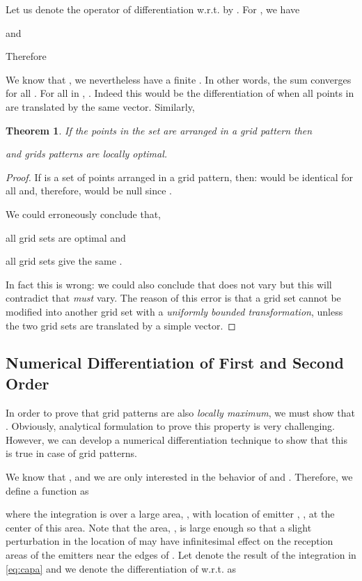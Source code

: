 \documentclass[12pt,english]{article}
\newtheorem{theorem}{Theorem}[section]
\begin{document}
Let us denote the operator of differentiation w.r.t.  by . For \mbox{}, we have 
 
and 
 
Therefore

We know that \mbox{}, we nevertheless have a finite . In other words, the sum  converges for all . For all  in , \mbox{}. Indeed this would be the differentiation of  when all points in  are translated by the same vector. Similarly, 
 

\begin{theorem}
If the points in the set  are arranged in a grid pattern then 
 
and grids patterns are {\em locally optimal}. 
\end{theorem}

\begin{proof}
If  is a set of points arranged in a grid pattern, then: \mbox{} would be identical for all  and, therefore, would be null since \mbox{}. 

We could erroneously conclude that,
\begin{compactitem}[-]
\item all grid sets are optimal and
\item all grid sets give the same .
\end{compactitem}
In fact this is wrong: we could also conclude that  does not vary but this will contradict that  {\em must} vary. The reason of this error is that a grid set cannot be modified into another grid set with a {\em uniformly bounded transformation}, unless the two grid sets are translated by a simple vector. 
\end{proof}

\subsection{Numerical Differentiation of First and Second Order}
\label{sec:grid_second_order}

In order to prove that grid patterns are also {\em locally maximum}, we must show that
.
Obviously, analytical formulation to prove this property is very challenging. However, we can develop a numerical differentiation technique to show that this is true in case of grid patterns. 

We know that \mbox{}, and we are only interested in the behavior of  and . Therefore, we define a function  as

where the integration is over a large area, , with location of emitter , , at the center of this area. Note that the area, , is large enough so that a slight perturbation in the location of  may have infinitesimal effect on the reception areas of the emitters near the edges of . Let  denote the result of the integration in \eqref{eq:capa} and we denote the differentiation of  w.r.t.  as
\end{document}

